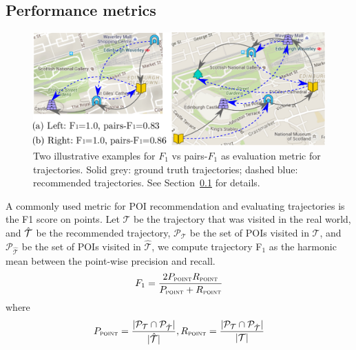 \subsection{Performance metrics}
\label{sec:metric}
\secmoveup

\begin{figure}[t]
	\centering
	\includegraphics[width=\columnwidth]{fig/pairF1.pdf}
	\caption{Two illustrative examples for $F_1$ vs pairs-$F_1$ as evaluation metric for trajectories. Solid grey: ground truth trajectories; dashed blue: recommended trajectories. 
    See Section~\ref{sec:metric} for details.}
	\label{fig:pairf1}\captionmoveup
\end{figure}


A commonly used metric for POI recommendation and evaluating trajectories is 
the F1 score on points. 
Let $\mathcal{T}$ be the trajectory that was visited in the real world,
and $\hat{\cal T}$ be the recommended trajectory,
$\mathcal{P}_{\mathcal{T}}$ be the set of POIs visited in $\mathcal{T}$,
and $\mathcal{P}_{\hat{\mathcal{T}}}$ be the set of POIs visited in $\hat{\mathcal{T}}$,
we compute trajectory F$_1$ as the harmonic mean between the point-wise precision and recall. 
\begin{displaymath}
F_1= \frac{2  P_{\textsc{point}}  R_{\textsc{point}}}
          {P_{\textsc{point}} + R_{\textsc{point}}}
\end{displaymath}
where
\begin{displaymath}\eqmoveup
P_{\textsc{point}} = \frac{|\mathcal{P}_{\mathcal{T}} \cap \mathcal{P}_{\hat{\mathcal{T}}}|}
                          {|\hat{\mathcal{T}}|},
R_{\textsc{point}} = \frac{|\mathcal{P}_{\mathcal{T}} \cap \mathcal{P}_{\hat{\mathcal{T}}}|}
                          {|\mathcal{T}|}
\end{displaymath}

